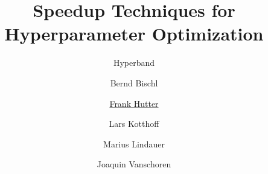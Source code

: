 

\title{Speedup Techniques for Hyperparameter Optimization}
\subtitle{Hyperband}
\author[Frank Hutter]{Bernd Bischl \and \underline{Frank Hutter} \and Lars Kotthoff\newline \and Marius Lindauer \and Joaquin Vanschoren}
\institute{}
\date{}




\maketitle




    
	    
